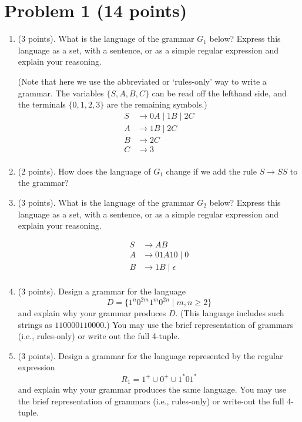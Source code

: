 \documentclass[letterpaper,11pt,twoside]{article}
\theoremstyle{plain}
\theoremstyle{definition}
\theoremstyle{remark}
\theoremstyle{restate}
\begin{document}
\clearpage
\section{Problem 1 (14 points)}
    \begin{enumerate}
         \item (3 points). What is the language of the grammar $G_1$ below? Express this language as a set, with a sentence, or as a simple regular expression and explain your reasoning.

        (Note that here we use the abbreviated or `rules-only' way to write a grammar. The variables $\{S, A, B, C\}$ can be read off the lefthand side, and the terminals $\{0, 1, 2, 3\}$ are the remaining symbols.)
        \begin{align*}
            S &\rightarrow 0A \; | \; 1B \; | \; 2C \\
            A &\rightarrow 1B \; | \; 2C    \\
            B &\rightarrow 2C \; \\
            C &\rightarrow 3 \\
        \end{align*}

        \item (2 points). How does the language of $G_1$ change if we add the rule $S \rightarrow SS$ to the grammar?

    
        \item (3 points). What is the language of the grammar $G_2$ below? Express this language as a set, with a sentence, or as a simple regular expression and explain your reasoning.
        
        \begin{align*}
            S &\rightarrow AB \\
            A &\rightarrow 01A10 \; | \; 0 \\
            B &\rightarrow 1B \; | \; \epsilon \\
        \end{align*}
        
        
        \item (3 points). Design a grammar for the language
        \[
            D = \{ 1^n 0^{2m} 1^m 0^{2n} \; | \; m, n \geq 2 \}
        \]
        and explain why your grammar produces $D$. (This language includes such strings as $110000110000$.) You may use the brief representation of grammars (i.e., rules-only) or write out the full 4-tuple.
        
        \item (3 points). Design a grammar for the language represented by the regular expression
        \[
            R_1 = 1^+ \cup 0^+ \cup 1^*01^*
        \]
        and explain why your grammar produces the same language. You may use the brief representation of grammars (i.e., rules-only) or write-out the full 4-tuple.
    \end{enumerate}
\end{document}
